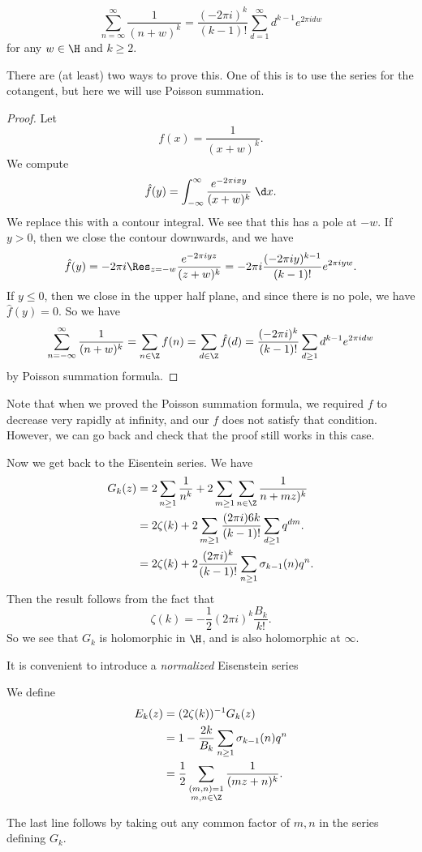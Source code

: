 \documentclass[a4paper]{article}
\begin{document}
\begin{lemma}
  \[
    \sum_{n = \infty}^\infty \frac{1}{(n + w)^k} = \frac{(-2\pi i)^k}{(k - 1)!} \sum_{d = 1}^\infty d^{k - 1} e^{2\pi i d w}
  \]
  for any $w \in \H$ and $k \geq 2$.
\end{lemma}
There are (at least) two ways to prove this. One of this is to use the series for the cotangent, but here we will use Poisson summation.

\begin{proof}
  Let
  \[
    f(x) = \frac{1}{(x + w)^k}.
  \]
  We compute
  \[
    \hat{f}(y) = \int_{-\infty}^\infty \frac{e^{-2\pi i x y}}{(x + w)^k}\;\d x.
  \]
  We replace this with a contour integral. We see that this has a pole at $-w$. If $y > 0$, then we close the contour downwards, and we have
  \[
    \hat{f}(y) = -2\pi i \Res_{z = -w} \frac{e^{-2\pi i y z}}{(z + w)^k} = -2\pi i \frac{(-2\pi i y)^{k - 1}}{(k - 1)!} e^{2\pi i yw}.
  \]
  If $y \leq 0$, then we close in the upper half plane, and since there is no pole, we have $\hat{f}(y) = 0$. So we have
  \[
    \sum_{n = -\infty}^\infty \frac{1}{(n + w)^k} = \sum_{n \in \Z} f(n) = \sum_{d \in \Z} \hat{f}(d) = \frac{(-2\pi i)^k}{(k - 1)!} \sum_{d \geq 1} d^{k - 1} e^{2\pi i d w}
  \]
  by Poisson summation formula.
\end{proof}

Note that when we proved the Poisson summation formula, we required $f$ to decrease very rapidly at infinity, and our $f$ does not satisfy that condition. However, we can go back and check that the proof still works in this case.

Now we get back to the Eisentein series. We have
\begin{align*}
  G_k(z) &= 2 \sum_{n \geq 1} \frac{1}{n^k} + 2 \sum_{m \geq 1} \sum_{n \in \Z} \frac{1}{n + mz)^k}\\
  &= 2 \zeta(k) + 2 \sum_{m \geq 1} \frac{(2\pi i )6k}{(k - 1)!} \sum_{d \geq 1} q^{dm}.\\
  &= 2 \zeta(k) + 2 \frac{(2\pi i)^k}{(k - 1)!} \sum_{n \geq 1} \sigma_{k - 1}(n) q^n.
\end{align*}
Then the result follows from the fact that
\[
  \zeta(k) = -\frac{1}{2} (2\pi i)^k \frac{B_k}{k!}.
\]
So we see that $G_k$ is holomorphic in $\H$, and is also holomorphic at $\infty$.

It is convenient to introduce a \emph{normalized} Eisenstein series
\begin{defi}
  We define
  \begin{align*}
    E_k(z) &= (2 \zeta(k))^{-1} G_k(z) \\
    &= 1 - \frac{2k}{B_k} \sum_{n \geq 1} \sigma_{k - 1}(n) q^n\\
    &= \frac{1}{2} \sum_{\substack{(m, n) = 1\\m , n \in \Z}} \frac{1}{(mz + n)^k}.
  \end{align*}
\end{defi}
The last line follows by taking out any common factor of $m, n$ in the series defining $G_k$.
\end{document}
